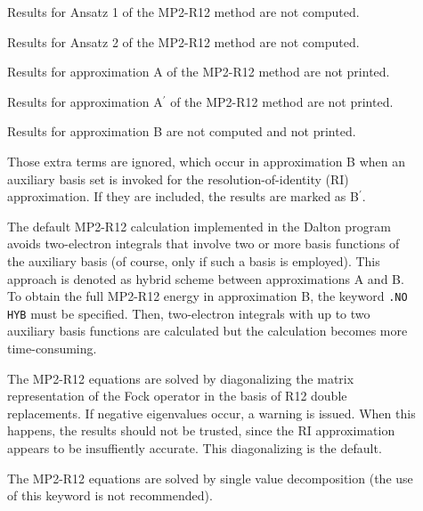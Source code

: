 \begin{description}

\item[]

Results for Ansatz 1 of the MP2-R12 method are not computed.

\item[]

Results for Ansatz 2 of the MP2-R12 method are not computed.

\item[]

Results for approximation A of the MP2-R12 method are not printed.

\item[]

Results for approximation A$^\prime$ of the MP2-R12 method are not printed.

\item[]

Results for approximation B are not computed and not printed.

\item[]

Those extra terms are ignored, which occur in approximation B when an auxiliary basis set
is invoked for the resolution-of-identity (RI) approximation. If they are included, 
the results are marked as B$^\prime$.

\item[]

The default MP2-R12 calculation implemented in the Dalton program
avoids two-electron integrals that involve
two or more basis functions of the auxiliary basis (of course, only
if such a basis is employed). This approach is denoted
as hybrid scheme between approximations A and B. To obtain the
full MP2-R12 energy in approximation B, the keyword \verb|.NO HYB| must
be specified. Then, two-electron integrals with up to two
auxiliary basis functions are calculated but the calculation becomes 
more time-consuming.

\item[]
The MP2-R12 equations are solved by diagonalizing the matrix representation 
of the Fock operator in the basis of R12 double replacements. If 
negative eigenvalues occur,
a warning is issued. When this happens, the results should not be trusted,
since the RI approximation appears to be insuffiently accurate.
This diagonalizing is the default.

\item[]
The MP2-R12 equations are solved by single value decomposition
(the use of this keyword is not recommended).


\end{description}
